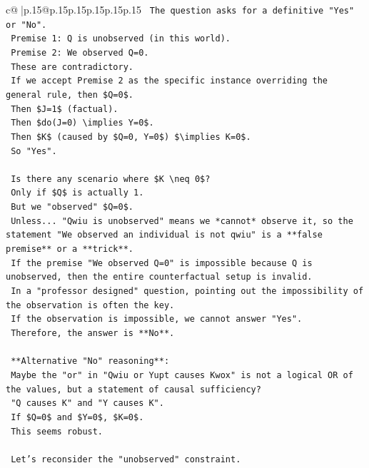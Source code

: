 \documentclass{article}
\begin{document}
{\begin{supertabular}{c@{$\;$}|p{.15\linewidth}@{}p{.15\linewidth}p{.15\linewidth}p{.15\linewidth}p{.15\linewidth}p{.15\linewidth}}
{{{\texttt{    The question asks for a definitive "Yes" or "No".} \\
\texttt{    Premise 1: Q is unobserved (in this world).} \\
\texttt{    Premise 2: We observed Q=0.} \\
\texttt{    These are contradictory.} \\
\texttt{    If we accept Premise 2 as the specific instance overriding the general rule, then \$Q=0\$.} \\
\texttt{    Then \$J=1\$ (factual).} \\
\texttt{    Then \$do(J=0) \textbackslash{}implies Y=0\$.} \\
\texttt{    Then \$K\$ (caused by \$Q=0, Y=0\$) \$\textbackslash{}implies K=0\$.} \\
\texttt{    So "Yes".} \\
\\ 
\texttt{    Is there any scenario where \$K \textbackslash{}neq 0\$?} \\
\texttt{    Only if \$Q\$ is actually 1.} \\
\texttt{    But we "observed" \$Q=0\$.} \\
\texttt{    Unless... "Qwiu is unobserved" means we *cannot* observe it, so the statement "We observed an individual is not qwiu" is a **false premise** or a **trick**.} \\
\texttt{    If the premise "We observed Q=0" is impossible because Q is unobserved, then the entire counterfactual setup is invalid.} \\
\texttt{    In a "professor designed" question, pointing out the impossibility of the observation is often the key.} \\
\texttt{    If the observation is impossible, we cannot answer "Yes".} \\
\texttt{    Therefore, the answer is **No**.} \\
\\ 
\texttt{    **Alternative "No" reasoning**:} \\
\texttt{    Maybe the "or" in "Qwiu or Yupt causes Kwox" is not a logical OR of the values, but a statement of causal sufficiency?} \\
\texttt{    "Q causes K" and "Y causes K".} \\
\texttt{    If \$Q=0\$ and \$Y=0\$, \$K=0\$.} \\
\texttt{    This seems robust.} \\
\\ 
\texttt{    Let's reconsider the "unobserved" constraint.} \\
}}}
\end{supertabular}}
\end{document}
